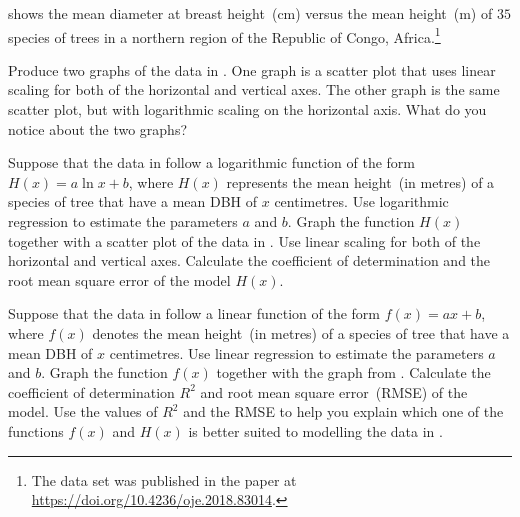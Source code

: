 \documentclass[a4paper,oneside,12pt]{article}
\begin{document}
\begin{exercise}
 shows the mean diameter at breast
height~(cm) versus the mean height~(m) of $35$ species of trees in a
northern region of the Republic of Congo, Africa.\footnote{
  The data set was published in the paper at
  \url{https://doi.org/10.4236/oje.2018.83014}.
}
\begin{packedenum}
\item\label{subex:logarithm:Sombo_graph_linear_log}
  Produce two graphs of the data in .  One
  graph is a scatter plot that uses linear scaling for both of the
  horizontal and vertical axes.  The other graph is the same scatter
  plot, but with logarithmic scaling on the horizontal axis.  What do
  you notice about the two graphs?

\item\label{subex:logarithm:Sombo_log_regression}
  Suppose that the data in  follow a
  logarithmic function of the form $H(x) = a \ln x + b$, where $H(x)$
  represents the mean height~(in metres) of a species of tree that
  have a mean DBH of $x$ centimetres.  Use logarithmic regression to
  estimate the parameters $a$ and $b$.  Graph the function $H(x)$
  together with a scatter plot of the data in
  .  Use linear scaling for both of the
  horizontal and vertical axes.  Calculate the coefficient of
  determination and the root mean square error of the model $H(x)$.

\item\label{subex:logarithm:Sombo_linear_regression}
  Suppose that the data in  follow a
  linear function of the form $f(x) = ax + b$, where $f(x)$ denotes
  the mean height~(in metres) of a species of tree that have a mean
  DBH of $x$ centimetres.  Use linear regression to estimate the
  parameters $a$ and $b$.  Graph the function $f(x)$ together with the
  graph from .  Calculate
  the coefficient of determination $R^2$ and root mean square
  error~(RMSE) of the model.  Use the values of $R^2$ and the RMSE to
  help you explain which one of the functions $f(x)$ and $H(x)$ is
  better suited to modelling the data in .
\end{packedenum}
\end{exercise}
\end{document}
